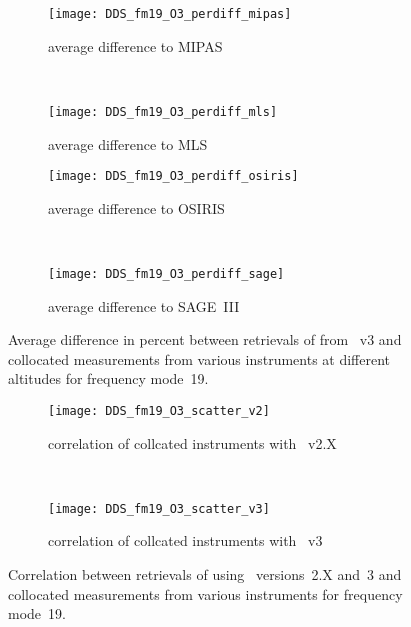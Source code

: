 \begin{figure}[htpb]
    \centering
    \begin{subfigure}[b]{0.49\textwidth}
        \texttt{[image: DDS\_fm19\_O3\_perdiff\_mipas]}
        \caption{average difference to MIPAS}
        \label{fig:fm19:O3:profiles:MIPAS}
    \end{subfigure}
    \,
    \begin{subfigure}[b]{0.49\textwidth}
        \texttt{[image: DDS\_fm19\_O3\_perdiff\_mls]}
        \caption{average difference to MLS}
        \label{fig:fm19:O3:profiles:MLS}
    \end{subfigure}

    \begin{subfigure}[b]{0.49\textwidth}
        \texttt{[image: DDS\_fm19\_O3\_perdiff\_osiris]}
        \caption{average difference to OSIRIS}
        \label{fig:fm19:O3:profiles:OSIRIS}
    \end{subfigure}
    \,
    \begin{subfigure}[b]{0.49\textwidth}
        \texttt{[image: DDS\_fm19\_O3\_perdiff\_sage]}
        \caption{average difference to SAGE~III}
        \label{fig:fm19:O3:profiles:SAGEIII}
    \end{subfigure}
    \caption{Average difference in percent between retrievals of 
    from \smr~v3 and collocated measurements from various instruments at
    different altitudes for frequency mode~19.}

    \label{fig:fm19:O3:profiles}
\end{figure}

\begin{figure}[htpb]
    \centering
    \begin{subfigure}[b]{0.49\textwidth}
        \texttt{[image: DDS\_fm19\_O3\_scatter\_v2]}
        \caption{correlation of collcated instruments with \smr~v2.X}
        \label{fig:fm19:O3:scatter:v2}
    \end{subfigure}
    \,
    \begin{subfigure}[b]{0.49\textwidth}
        \texttt{[image: DDS\_fm19\_O3\_scatter\_v3]}
        \caption{correlation of collcated instruments with \smr~v3}
        \label{fig:fm19:O3:scatter:v3}
    \end{subfigure}
    \caption{Correlation between retrievals of  using \smr\
    versions~2.X and~3 and collocated measurements from various instruments
    for frequency mode~19.}
    \label{fig:fm19:O3:scatter}
\end{figure}


